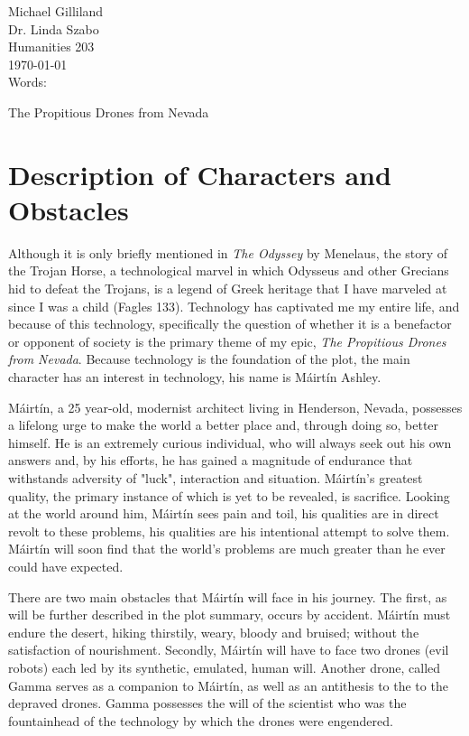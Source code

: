 \documentclass[12pt]{article}
\newcommand{\mc}{M\'airt\'in}
\newcommand{\mcs}{M\'airt\'in }
\begin{document}
\begin{flushleft}

Michael Gilliland \\
Dr. Linda Szabo \\
Humanities 203 \\
\today \\
Words: \\

\begin{center}
{\large The Propitious Drones from Nevada}
\end{center}

\setlength{\parindent}{0.5in} 


\section{Description of Characters and Obstacles}

\indent Although it is only briefly mentioned in \emph{The Odyssey} by Menelaus, the story of
the Trojan Horse, a technological marvel in which Odysseus and other Grecians hid to defeat the Trojans,
is a legend of Greek heritage that I have marveled at since I was a child (Fagles 133).
Technology has captivated me my entire life, and because of this technology, specifically the question of
whether it is a benefactor or opponent of society is the primary theme of my epic, \emph{The Propitious
Drones from Nevada}. Because technology is the foundation of the plot, the main character has an interest
in technology, his name is \mcs Ashley.

\mc, a 25 year-old, modernist architect living in Henderson, Nevada, possesses a lifelong urge
to make the world a better place and, through doing so, better himself. He is an extremely curious individual,
who will always seek out his own answers and, by his efforts, he has gained a magnitude of endurance that withstands
adversity of "luck", interaction and situation. \mc's greatest quality, the primary instance of which is yet to be 
revealed, is sacrifice. Looking at the world around him, \mcs sees pain and toil, his qualities are in direct revolt to these
problems, his qualities are his intentional attempt to solve them. \mcs will soon find that the world's problems
are much greater than he ever could have expected.

There are two main obstacles that \mcs will face in his journey. The first, as will be further described in the plot summary,
occurs by accident. \mcs must endure the desert, hiking thirstily, weary, bloody and bruised; without the satisfaction
of nourishment. Secondly, \mcs will have to face two drones (evil robots) each led by its synthetic, emulated, human
will. Another drone, called Gamma serves as a companion to \mc, as well as an antithesis to the to the depraved drones.
Gamma possesses the will of the scientist who was the fountainhead of the technology by which the drones were
engendered.


\end{flushleft}
\end{document}
